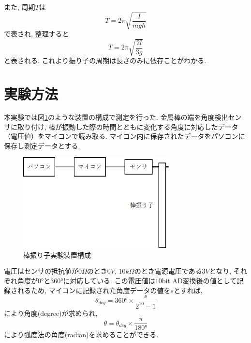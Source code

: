 \documentclass{jarticle}
\begin{document}
また, 周期$T$は
\begin{equation}
  T=2\pi\sqrt{\frac{I}{mgh}}
  \label{eq:T-1}
\end{equation}
で表され, 整理すると
\begin{equation}
  T=2\pi\sqrt{\frac{2l}{3g}}
  \label{eq:T-2}
\end{equation}
と表される.
これより振り子の周期は長さのみに依存ことがわかる.



\section{実験方法}

本実験では図\ref{fg:rod-pendulum-method}のような装置の構成で測定を行った.
金属棒の端を角度検出センサに取り付け, 棒が振動した際の時間とともに変化する角度に対応したデータ（電圧値）をマイコンで読み取る.
マイコン内に保存されたデータをパソコンに保存し測定データとする.

\begin{figure}[H]
  \begin{center}
    \includegraphics[width=80mm]{experimental_method_picture.jpg}
    \caption{棒振り子実験装置構成}
    \label{fg:rod-pendulum-method}
  \end{center}
\end{figure}

電圧はセンサの抵抗値が$0\Omega$のとき$0V$, $10k\Omega$のとき電源電圧である$3V$となり, それぞれ角度が$0°$と$360°$に対応している.
この電圧値は$10$bit AD変換後の値として記録されるため, マイコンに記録された角度データの値を$s$とすれば,
\begin{equation}
  \theta_{deg}=360°\times\frac{s}{2^{10}-1}
\end{equation}
により角度(degree)が求められ,
\begin{equation}
  \theta=\theta_{deg}\times\frac{\pi}{180°}
\end{equation}
により弧度法の角度(radian)を求めることができる.
\end{document}
